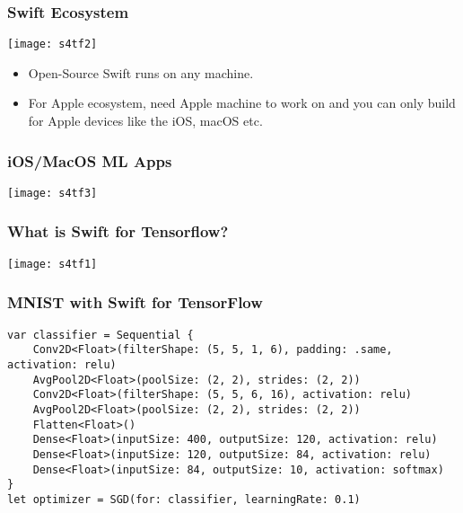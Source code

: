 \begin{frame} \frametitle{Swift Ecosystem}
\begin{center}
\texttt{[image: s4tf2]}
\end{center}

\begin{itemize}
\item Open-Source Swift runs on any machine.
\item For Apple ecosystem, need Apple machine to work on and you can only build for Apple devices like the iOS, macOS etc.
\end{itemize}

\end{frame}

\begin{frame} \frametitle{iOS/MacOS ML Apps}
\begin{center}
\texttt{[image: s4tf3]}
\end{center}
\end{frame}



\begin{frame} \frametitle{What is Swift for Tensorflow?}
\begin{center}
\texttt{[image: s4tf1]}
\end{center}
\end{frame}

\begin{frame}[fragile] \frametitle{MNIST with Swift for TensorFlow}


\begin{lstlisting}
var classifier = Sequential {
    Conv2D<Float>(filterShape: (5, 5, 1, 6), padding: .same, activation: relu)
    AvgPool2D<Float>(poolSize: (2, 2), strides: (2, 2))
    Conv2D<Float>(filterShape: (5, 5, 6, 16), activation: relu)
    AvgPool2D<Float>(poolSize: (2, 2), strides: (2, 2))
    Flatten<Float>()
    Dense<Float>(inputSize: 400, outputSize: 120, activation: relu)
    Dense<Float>(inputSize: 120, outputSize: 84, activation: relu)
    Dense<Float>(inputSize: 84, outputSize: 10, activation: softmax)
}
let optimizer = SGD(for: classifier, learningRate: 0.1)
\end{lstlisting}
\end{frame}

